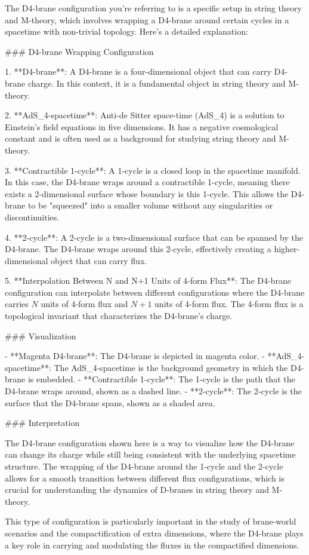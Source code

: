 The D4-brane configuration you're referring to is a specific setup in string theory and M-theory, which involves wrapping a D4-brane around certain cycles in a spacetime with non-trivial topology. Here's a detailed explanation:

### D4-brane Wrapping Configuration

1. **D4-brane**: A D4-brane is a four-dimensional object that can carry D4-brane charge. In this context, it is a fundamental object in string theory and M-theory.

2. **AdS_4-spacetime**: Anti-de Sitter space-time (AdS_4) is a solution to Einstein's field equations in five dimensions. It has a negative cosmological constant and is often used as a background for studying string theory and M-theory.

3. **Contractible 1-cycle**: A 1-cycle is a closed loop in the spacetime manifold. In this case, the D4-brane wraps around a contractible 1-cycle, meaning there exists a 2-dimensional surface whose boundary is this 1-cycle. This allows the D4-brane to be "squeezed" into a smaller volume without any singularities or discontinuities.

4. **2-cycle**: A 2-cycle is a two-dimensional surface that can be spanned by the D4-brane. The D4-brane wraps around this 2-cycle, effectively creating a higher-dimensional object that can carry flux.

5. **Interpolation Between N and N+1 Units of 4-form Flux**: The D4-brane configuration can interpolate between different configurations where the D4-brane carries \(N\) units of 4-form flux and \(N+1\) units of 4-form flux. The 4-form flux is a topological invariant that characterizes the D4-brane's charge.

### Visualization

- **Magenta D4-brane**: The D4-brane is depicted in magenta color.
- **AdS_4-spacetime**: The AdS_4-spacetime is the background geometry in which the D4-brane is embedded.
- **Contractible 1-cycle**: The 1-cycle is the path that the D4-brane wraps around, shown as a dashed line.
- **2-cycle**: The 2-cycle is the surface that the D4-brane spans, shown as a shaded area.

### Interpretation

The D4-brane configuration shown here is a way to visualize how the D4-brane can change its charge while still being consistent with the underlying spacetime structure. The wrapping of the D4-brane around the 1-cycle and the 2-cycle allows for a smooth transition between different flux configurations, which is crucial for understanding the dynamics of D-branes in string theory and M-theory.

This type of configuration is particularly important in the study of brane-world scenarios and the compactification of extra dimensions, where the D4-brane plays a key role in carrying and modulating the fluxes in the compactified dimensions.